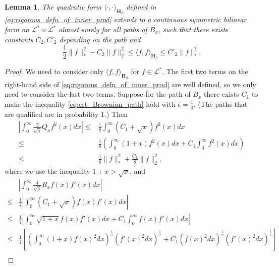 \documentclass[11pt, a4paper]{article}
\numberwithin{equation}{section}
\newcommand{\Lstar}{\mathcal{L}^*}
\newcommand{\Hbeta}{\mathbf{H}_{\beta}}
\newtheorem{lem}{Lemma}
\theoremstyle{definition}
\theoremstyle{remark}
\begin{document}
\begin{lem} \label{lem:well-definedness_of_Hbeta}
  The quadratic form $\langle \cdot, \cdot \rangle_{\Hbeta}$ defined in \eqref{eq:rigorous_defn_of_inner_prod} extends to a continuous symmetric bilinear form on $\Lstar \times \Lstar$ almost surely for all paths of $B_x$, such that there exists constants $C_2, C'_2$ depending on the path and
  \begin{equation} \label{eq:estimate_of_Hbeta}
    \frac{1}{2} \lVert f \rVert^2_* - C_2 \lVert f \rVert^2_2 \leq \langle f, f \rangle_{\Hbeta} \leq C'_2 \lVert f \rVert^2_*.
  \end{equation}
\end{lem}
\begin{proof}
  We need to consider only $\langle f, f \rangle_{\Hbeta}$ for $f \in \Lstar$. The first two terms on the right-hand side of \eqref{eq:rigorous_defn_of_inner_prod} are well defined, so we only need to consider the last two terms. Suppose for the path of $B_x$ there exists $C_1$ to make the inequality \eqref{eq:est_Brownian_path} hold with $\epsilon = \frac{1}{4}$. (The paths that are qualified are in probability $1$.) Then
  \begin{equation} \label{eq:est_Qx}
    \begin{split}
      \left\lvert \int^{\infty}_0 \frac{2}{\sqrt{\beta}} Q_x f^2(x) dx \right\rvert \leq {}& \frac{1}{8} \int^{\infty}_0 (C_1  + \sqrt{x}) f^2(x) dx \\
      \leq {}& \frac{1}{8} \left( \int^{\infty}_0 (1 + x) f^2(x) dx + C_1 \int^{\infty}_0 f^2(x) dx \right) \\
      \leq {}& \frac{1}{8} \lVert f \rVert^2_* + \frac{C_1}{8} \lVert f \rVert^2_2,
    \end{split}
  \end{equation}
  where we use the inequality $1 + x > \sqrt{x}$, and
  \begin{equation} \label{eq:est_Rx}
    \begin{split}
      & \left\lvert \int^{\infty}_0 \frac{4}{\sqrt{\beta}} R_x f(x) f'(x) dx \right\rvert \\
      \leq {}& \frac{1}{4} \left\lvert \int^{\infty}_0 (C_1 + \sqrt{x}) f(x) f'(x) dx \right\rvert \\
      \leq {}& \frac{1}{4} \left\lvert \int^{\infty}_0 \sqrt{1 + x} f(x) f'(x) dx + C_1 \int^{\infty}_0 f(x) f'(x) dx \right\rvert \\
      \leq {}& \frac{1}{4} \left[ \left( \int^{\infty}_0 (1 + x) f(x)^2 dx \right)^{\frac{1}{2}} \left( f'(x)^2 dx \right)^{\frac{1}{2}} + C_1 \left( f(x)^2 dx \right)^{\frac{1}{2}} \left( f'(x)^2 dx \right)^{\frac{1}{2}} \right] \\

\end{split}
\end{equation}
\end{proof}
\end{document}
